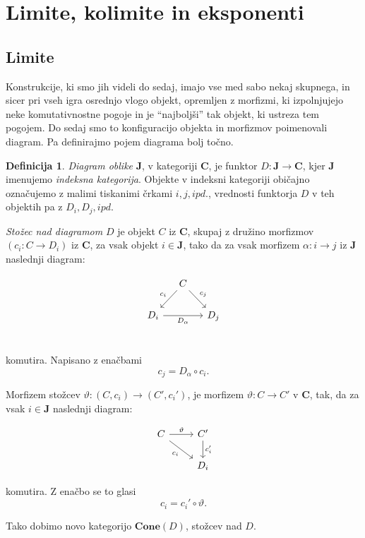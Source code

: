 \documentclass[12pt,a4paper]{book}
\theoremstyle{definition}
\newtheorem{definicija}{Definicija}[chapter]
\theoremstyle{plain}
\theoremstyle{definition}
\theoremstyle{remark}
\newcommand{\cat}[1]{\textbf{#1}}
\begin{document}
\section{Limite, kolimite in eksponenti}


\subsection{Limite}

Konstrukcije, ki smo jih videli do sedaj, imajo vse med sabo nekaj skupnega, in sicer pri vseh igra osrednjo vlogo objekt, opremljen z morfizmi, ki izpolnjujejo neke komutativnostne pogoje in je "`najboljši"' tak objekt, ki ustreza tem pogojem. Do sedaj smo to konfiguracijo objekta in morfizmov poimenovali diagram. Pa definirajmo pojem diagrama bolj točno.

\begin{definicija}
\emph{Diagram oblike} $\cat{J}$, v kategoriji $\cat{C}$, je funktor $D : \cat{J} \to \cat{C}$, kjer $\cat{J}$ imenujemo \emph{indeksna kategorija}. Objekte v indeksni kategoriji običajno označujemo z malimi tiskanimi črkami $i,j, ipd.$, vrednosti funktorja $D$ v teh objektih pa z $D_i,D_j, ipd.$


\emph{Stožec nad diagramom} $D$ je objekt $C$ iz $\cat{C}$, skupaj z družino morfizmov $(c_i : C \to D_i)$ iz $\cat{C}$, za vsak objekt $i \in \cat{J}$, tako da za vsak morfizem $\alpha : i \to j$ iz $\cat{J}$ naslednji diagram:

$$\begin{tikzcd}[column sep=small]
& C \ar[dl, "c_i"'] \ar[dr, "c_j"] & \\
D_i \ar[rr, "D_\alpha"'] & & D_j \\
\end{tikzcd}$$

komutira. Napisano z enačbami $$c_j = D_\alpha \circ c_i.$$

Morfizem stožcev $\vartheta : (C, c_i) \to (C', c_i')$, je morfizem $\vartheta : C \to C'$ v $\cat{C}$, tak, da za vsak $i \in \cat{J}$ naslednji diagram:

$$\begin{tikzcd}
C \ar[dr, "c_i"'] \ar[r, "\vartheta"] & C' \ar[d, "c_i'"] \\
& D_i
\end{tikzcd}$$

komutira. Z enačbo se to glasi
$$c_i = c_i' \circ \vartheta.$$

Tako dobimo novo kategorijo $\cat{Cone}(D)$, stožcev nad $D$.
\end{definicija}
\end{document}
